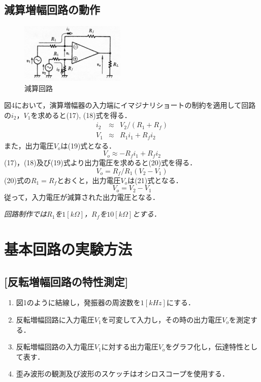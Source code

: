 \documentclass[10pt, a4j, dvipdfmx]{jarticle}
\begin{document}
\subsection{減算増幅回路の動作}
\begin{figure}
    \vspace*{-\intextsep}
    \begin{center}
     \includegraphics[width=50mm]{text/fig-4.jpg}
     \caption{減算回路}
    \end{center}
\end{figure}
図4において，演算増幅器の入力端にイマジナリショートの制約を適用して回路の$i_2$，$V_1$を求めると(17), (18)式を得る．
\begin{eqnarray}
    i_2 & \approx & V_2 / (R_1 + R_f) \\
    V_1 & \approx & R_1 i_1 + R_f i_2
\end{eqnarray}
また，出力電圧$V_o$は(19)式となる．
\begin{equation}
    V_o \approx -R_f i_1 + R_f i_2
\end{equation}
(17)，(18)及び(19)式より出力電圧を求めると(20)式を得る．
\begin{equation}
    V_o = R_f / R_1 (V_2 - V_1)
\end{equation}
(20)式の$R_1 = R_f$とおくと，出力電圧$V_o$は(21)式となる．
\begin{equation}
    V_o = V_2 - V_1
\end{equation}
従って，入力電圧が減算された出力電圧となる．

\emph{回路制作では$R_1$を$1[k\Omega]$，$R_f$を$10[k\Omega]$とする．}


\newpage
\section{基本回路の実験方法}
\renewcommand{\thesubsection}{\arabic{section}.\arabic{subsection}}
\subsection{[反転増幅回路の特性測定]}
\renewcommand{\labelenumi}{(\arabic{enumi})}
\begin{enumerate}
    \item 図1のように結線し，発振器の周波数を$1[kHz]$にする．
    \item 反転増幅回路に入力電圧$V_1$を可変して入力し，その時の出力電圧$V_o$を測定する．
    \item 反転増幅回路の入力電圧$V_1$に対する出力電圧$V_o$をグラフ化し，伝達特性として表す．
    \item 歪み波形の観測及び波形のスケッチはオシロスコープを使用する．
\end{enumerate}
\end{document}
